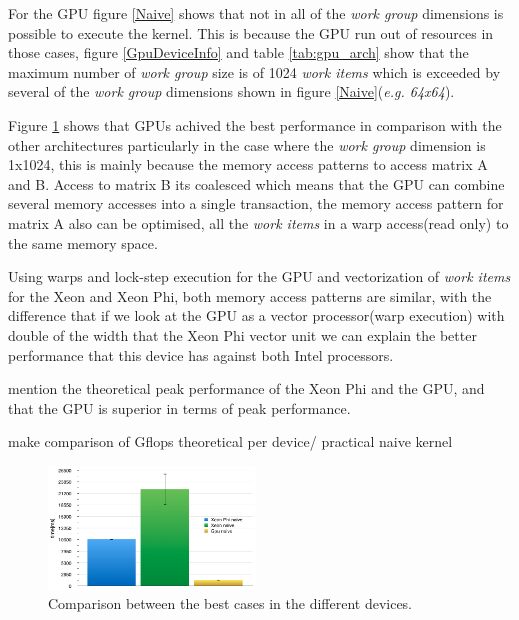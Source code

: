 \par{For the GPU figure \ref{Naive} shows that not in all of the 
    \emph{work group} dimensions is possible to execute the kernel. 
    This is because the GPU run out of resources in those cases\cite{opencl_error},
    figure \ref{GpuDeviceInfo} and table \ref{tab:gpu_arch} show that the 
    maximum number of \emph{work group} size is of 1024 \emph{work items} which
    is exceeded by several of the \emph{work group} dimensions shown in figure 
    \ref{Naive}(\emph{e.g. 64x64}).}

\par{Figure \ref{NaiveRes} shows that GPUs achived the best performance in 
    comparison with the other architectures particularly
    in the case where the \emph{work group} dimension is 1x1024,
    this is mainly because the memory access patterns to access matrix A and B. 
    Access to matrix B its coalesced which means that the GPU can combine several 
    memory accesses into a single transaction, the memory access pattern for matrix 
    A also can be optimised, all the \emph{work items} in a warp access(read only)
    to the same memory space}.

\par{Using warps and lock-step execution for the 
    GPU and vectorization of \emph{work items} for the Xeon and Xeon Phi, both
    memory access patterns are similar, with the difference that if we look at
    the GPU as a vector processor(warp execution) with double of the width that the
    Xeon Phi vector unit we can explain the better performance that this device 
    has against both Intel processors.}

\par{{\color{red} mention the theoretical peak performance of the Xeon Phi and 
    the GPU, and that the GPU is superior in terms of peak performance.}}

\par{{\color{red} make comparison of Gflops theoretical per device/ practical
    naive kernel}}

\begin{figure}[!h]
    \centering
    \includegraphics[width=0.49\textwidth]{figures/naiveRes.png}
    \caption{Comparison between the best cases in the different devices.}
    \label{NaiveRes}
\end{figure}



